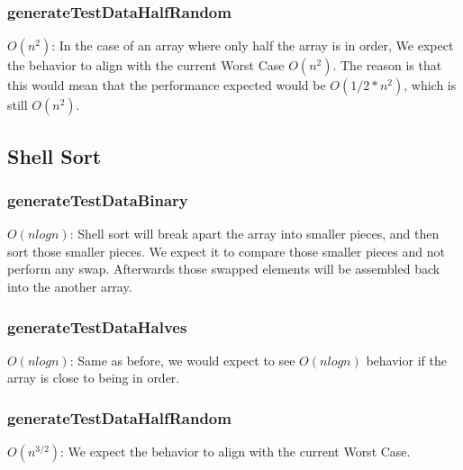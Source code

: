 \documentclass{article}
\begin{document}
\subsubsection{generateTestDataHalfRandom}

\textbf{$O(n^2)$}: In the case of an array where only half the array is in order, We expect the behavior to align with the current Worst Case $O(n^2)$. The reason is that this would mean that the performance expected would be $O(1/2*n^2)$, which is still $O(n^2)$.

\subsection{Shell Sort}

\subsubsection{generateTestDataBinary}

\textbf{$O(nlogn)$}: Shell sort will break apart the array into smaller pieces, and then sort those smaller pieces. We expect it to compare those smaller pieces and not perform any swap. Afterwards those swapped elements will be assembled back into the another array.

\subsubsection{generateTestDataHalves}

\textbf{$O(nlogn)$}: Same as before, we would expect to see $O(nlogn)$ behavior if the array is close to being in order.

\subsubsection{generateTestDataHalfRandom}

\textbf{$O(n^{3/2})$}: We expect the behavior to align with the current Worst Case.


\end{document}
